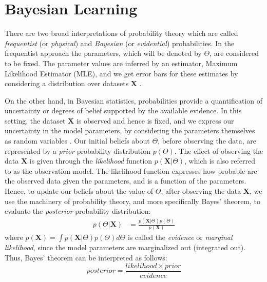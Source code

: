 \section{Bayesian Learning} \label{bayesian-learning-section}
There are two broad interpretations of probability theory which are called \emph{frequentist} (or \emph{physical}) and \emph{Bayesian} (or \emph{evidential}) probabilities. In the frequentist approach the parameters, which will be denoted by $\Theta$, are considered to be fixed. The parameter values are inferred by an estimator, \eg Maximum Likelihood Estimator (MLE), and we get error bars for these estimates by considering a distribution over datasets $\mathbf{X}$ \cite[Ch. 1]{Bishop2006}. 

On the other hand, in Bayesian statistics, probabilities provide a quantification of uncertainty or degrees of belief supported by the available evidence. In this setting, the dataset $\mathbf{X}$ is observed and hence is fixed, and we express our uncertainty in the model parameters, by considering the parameters themselves as random variables \cite[Ch. 1]{Bishop2006}. Our initial beliefs about $\Theta$, before observing the data, are represented by a \emph{prior} probability distribution $p(\Theta)$. The effect of observing the data $\mathbf{X}$ is given through the \emph{likelihood} function $p(\mathbf{X}|\Theta)$, which is also referred to as the observation model. The likelihood function expresses how probable are the observed data given the parameters, and is a function of the parameters. Hence, to update our beliefs about the value of $\Theta$, after observing the data $\mathbf{X}$, we use the machinery of probability theory, and more specifically Bayes' theorem, to evaluate the \emph{posterior} probability distribution:
\begin{equation}
  \begin{aligned}
	p(\Theta | \mathbf{X}) & = \frac{p(\mathbf{X}|\Theta) p(\Theta)}{p(\mathbf{X})} %
  \end{aligned}
\end{equation}
where $p(\mathbf{X}) = \int p(\mathbf{X}|\Theta) p(\Theta) d\Theta$ is called the \emph{evidence} or \emph{marginal likelihood}, since the model parameters are marginalized out (\ie integrated out). Thus, Bayes' theorem can be interpreted as follows:
\begin{equation}
	posterior = \frac{likelihood \times prior}{evidence}
\end{equation}

